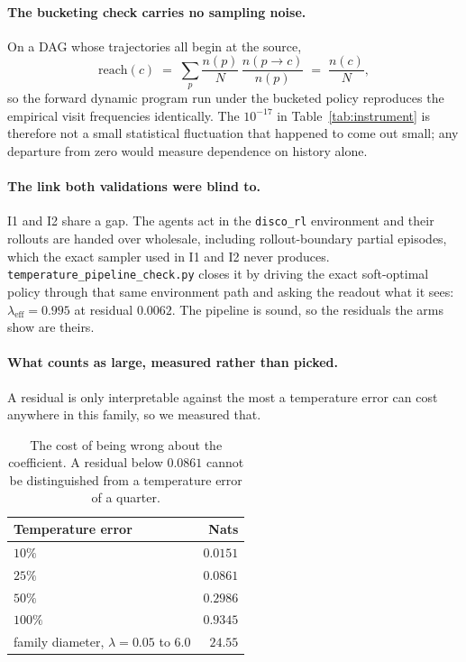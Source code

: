 \documentclass[11pt]{article}
\theoremstyle{remark}
\begin{document}
\paragraph{The bucketing check carries no sampling noise.} On a DAG whose
trajectories all begin at the source,
\begin{equation}
  \mathrm{reach}(c) \;=\; \sum_{p} \frac{n(p)}{N}\,\frac{n(p \to c)}{n(p)}
  \;=\; \frac{n(c)}{N},
  \label{eq:bucket}
\end{equation}
so the forward dynamic program run under the bucketed policy reproduces the
empirical visit frequencies identically. The $10^{-17}$ in
Table~\ref{tab:instrument} is therefore not a small statistical fluctuation that
happened to come out small; any departure from zero would measure dependence on
history alone.

\begin{sloppypar}
\paragraph{The link both validations were blind to.} I1 and I2 share a gap. The
agents act in the \texttt{disco\_rl} environment and their rollouts are handed
over wholesale, including rollout-boundary partial episodes, which the exact
sampler used in I1 and I2 never produces.
\texttt{temperature\_pipeline\_check.py} closes it by driving the exact
soft-optimal policy through that same environment path and asking the readout
what it sees: $\lambda_{\mathrm{eff}} = 0.995$ at residual $0.0062$. The pipeline
is sound, so the residuals the arms show are theirs.
\end{sloppypar}

\paragraph{What counts as large, measured rather than picked.} A residual is only
interpretable against the most a temperature error can cost anywhere in this
family, so we measured that.

\begin{table}[t]
\centering
\begin{tabular}{lr}
\toprule
Temperature error & Nats \\
\midrule
$10\%$ & $0.0151$ \\
$25\%$ & $\mathbf{0.0861}$ \\
$50\%$ & $0.2986$ \\
$100\%$ & $0.9345$ \\
family diameter, $\lambda = 0.05$ to $6.0$ & $24.55$ \\
\bottomrule
\end{tabular}
\caption{The cost of being wrong about the coefficient. A residual below
$0.0861$ cannot be distinguished from a temperature error of a quarter.}
\label{tab:scale}
\end{table}
\end{document}
